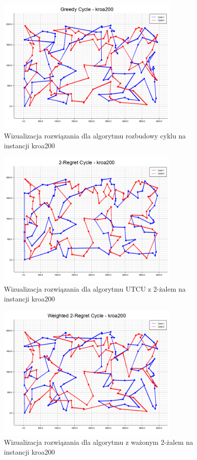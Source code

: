\documentclass[12pt,a4paper]{article}
\begin{document}
\begin{figure}[H]
\centering
\includegraphics[width=0.8\textwidth]{figures/kroa200_Greedy_Cycle.png}
\caption{Wizualizacja rozwiązania dla algorytmu rozbudowy cyklu na instancji kroa200}
\end{figure}

\begin{figure}[H]
\centering
\includegraphics[width=0.8\textwidth]{figures/kroa200_2-Regret_Cycle.png}
\caption{Wizualizacja rozwiązania dla algorytmu UTCU z 2-żalem na instancji kroa200}
\end{figure}

\begin{figure}[H]
\centering
\includegraphics[width=0.8\textwidth]{figures/kroa200_Weighted_2-Regret_Cycle.png}
\caption{Wizualizacja rozwiązania dla algorytmu z ważonym 2-żalem na instancji kroa200}
\end{figure}
\end{document}
